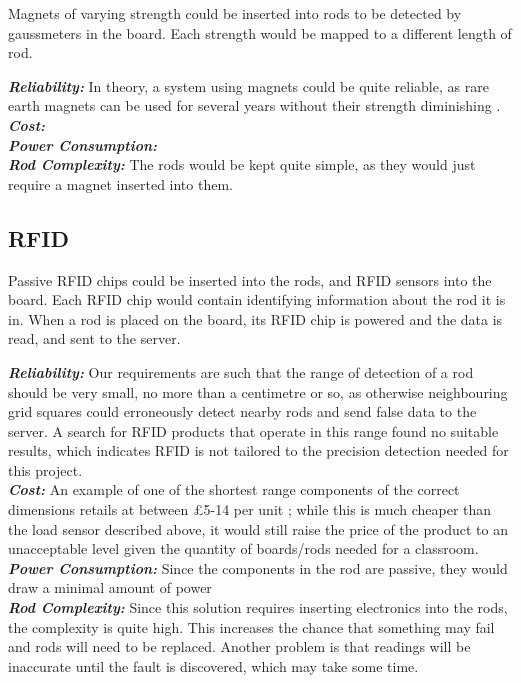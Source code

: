 Magnets of varying strength could be inserted into rods to be detected by gaussmeters in the board. Each strength would be mapped to a different length of rod. \\

{
\setlength{\parindent}{0pt} 

\textbf{\textit{Reliability:}} In theory, a system using magnets could be quite reliable, as rare earth magnets can be used for several years without their strength diminishing \cite{Permanen88:online}.    \\

\textbf{\textit{Cost:}}\\

\textbf{\textit{Power Consumption:}}\\

\textbf{\textit{Rod Complexity:}} The rods would be kept quite simple, as they would just require a magnet inserted into them.\\
}


\subsection{RFID}
\label{rfid}

Passive RFID chips could be inserted into the rods, and RFID sensors into the board. Each RFID chip would contain identifying information about the rod it is in. When a rod is placed on the board, its RFID chip is powered and the data is read, and sent to the server. \\

{
\setlength{\parindent}{0pt} 

\textbf{\textit{Reliability:}} Our requirements are such that the range of detection of a rod should be very small, no more than a centimetre or so, as otherwise neighbouring grid squares could erroneously detect nearby rods and send false data to the server. A search for RFID products that operate in this range found no suitable results, which indicates RFID is not tailored to the precision detection needed for this project.\\

\textbf{\textit{Cost:}} An example of one of the shortest range components of the correct dimensions retails at between £5-14 per unit \cite{RITRPR9U23:online}; while this is much cheaper than the load sensor described above, it would still raise the price of the product to an unacceptable level given the quantity of boards/rods needed for a classroom.\\

\textbf{\textit{Power Consumption:}} Since the components in the rod are passive, they would draw a minimal amount of power \\

\textbf{\textit{Rod Complexity:}} Since this solution requires inserting electronics into the rods, the complexity is quite high. This increases the chance that something may fail and rods will need to be replaced. Another problem is that readings will be inaccurate until the fault is discovered, which may take some time. \\
}



